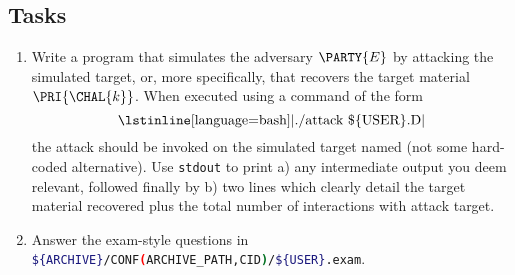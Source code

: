 \documentclass[crop={false},multi={true},tikz={true}]{standalone}
\begin{document}
\subsection{Tasks}

\begin{enumerate}
\item Write a program that simulates the adversary $\PARTY{E}$ by attacking
      the simulated target, or, more specifically, that recovers the target 
      material $\PRI{\CHAL{k}}$.  
      When executed using a command of the form
      \[
      \mbox{\lstinline[language={bash}]|./attack \$\{USER\}.D|}
      \]
      the attack should be invoked on the simulated target named (not some
      hard-coded alternative).  Use \lstinline[language={bash}]{stdout} to 
      print 
      a) any intermediate output you deem relevant, followed finally by 
      b) two lines which clearly detail the target material recovered plus
         the total number of interactions with attack target.
\item Answer the exam-style questions in 
      \lstinline[language={bash}]|${ARCHIVE}/CONF(ARCHIVE_PATH,CID)/${USER}.exam|.
\end{enumerate}


\ifstandalone
\printbibliography
\fi
\end{document}
